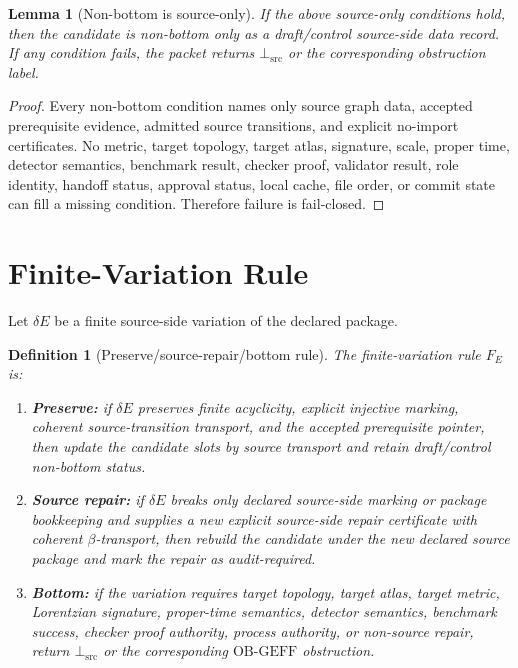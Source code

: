\documentclass[11pt]{article}
\newcommand{\BottomSrc}{\bot_{\mathrm{src}}}
\newcommand{\OBGEFF}{\mathrm{OB\mbox{-}GEFF}}
\newtheorem{definition}{Definition}
\newtheorem{lemma}{Lemma}
\begin{document}
\begin{lemma}[Non-bottom is source-only]
If the above source-only conditions hold, then the candidate is non-bottom only
as a draft/control source-side data record. If any condition fails, the packet
returns \(\BottomSrc\) or the corresponding obstruction label.
\end{lemma}

\begin{proof}
Every non-bottom condition names only source graph data, accepted prerequisite
evidence, admitted source transitions, and explicit no-import certificates.
No metric, target topology, target atlas, signature, scale, proper time,
detector semantics, benchmark result, checker proof, validator result, role
identity, handoff status, approval status, local cache, file order, or commit
state can fill a missing condition. Therefore failure is fail-closed.
\end{proof}

\section{Finite-Variation Rule}

Let \(\delta E\) be a finite source-side variation of the declared package.

\begin{definition}[Preserve/source-repair/bottom rule]
The finite-variation rule \(F_E\) is:
\begin{enumerate}[leftmargin=*]
  \item \textbf{Preserve:} if \(\delta E\) preserves finite acyclicity,
  explicit injective marking, coherent source-transition transport, and the
  accepted prerequisite pointer, then update the candidate slots by source
  transport and retain draft/control non-bottom status.
  \item \textbf{Source repair:} if \(\delta E\) breaks only declared
  source-side marking or package bookkeeping and supplies a new explicit
  source-side repair certificate with coherent \(\beta\)-transport, then
  rebuild the candidate under the new declared source package and mark the
  repair as audit-required.
  \item \textbf{Bottom:} if the variation requires target topology, target
  atlas, target metric, Lorentzian signature, proper-time semantics, detector
  semantics, benchmark success, checker proof authority, process authority, or
  non-source repair, return \(\BottomSrc\) or the corresponding \(\OBGEFF\)
  obstruction.
\end{enumerate}
\end{definition}
\end{document}
